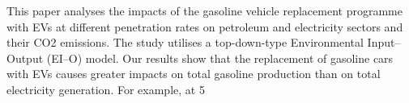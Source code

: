 This paper analyses the impacts of the gasoline vehicle replacement programme with EVs at different penetration rates on petroleum and electricity sectors and their CO2 emissions. The study utilises a top-down-type Environmental Input–Output (EI–O) model. Our results show that the replacement of gasoline cars with EVs causes greater impacts on total gasoline production than on total electricity generation. For example, at 5%